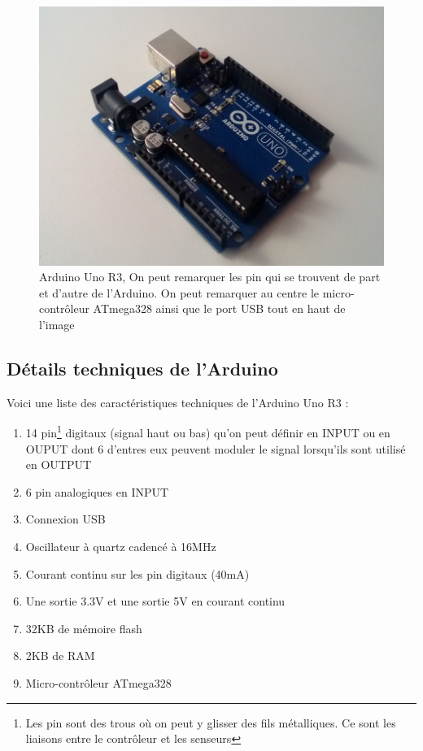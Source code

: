 \documentclass[a4paper,11pt]{report}
\begin{document}
{\begin{figure}[h]
\begin{center}
\includegraphics[scale=0.38]{arduino_uno.jpg}
\caption[Arduino Uno R3]{Arduino Uno R3\label{fig:ArduinoUnoR3}, On peut remarquer les pin  \label{pin} qui se trouvent de part et d'autre de l'Arduino. On peut remarquer au centre le micro-contrôleur ATmega328 ainsi que le port USB tout en haut de l'image}
\end{center}
\end{figure}


\subsection{Détails techniques de l'Arduino}

Voici une liste des caractéristiques techniques de l'Arduino Uno R3 \cite{Arduino}:
\begin{enumerate}
\item 14 pin\footnote{Les pin sont des trous où on peut y glisser des fils métalliques. Ce sont les liaisons entre le contrôleur et les senseurs} digitaux (signal haut ou bas) qu'on peut définir en INPUT ou en OUPUT dont 6 d'entres eux peuvent moduler le signal lorsqu'ils sont utilisé en OUTPUT
\item  6 pin analogiques en INPUT
\item Connexion USB
\item Oscillateur à quartz cadencé à 16MHz
\item Courant continu sur les pin digitaux (40mA)
\item Une sortie 3.3V et une sortie 5V en courant continu
\item 32KB de mémoire flash
\item 2KB de RAM
\item Micro-contrôleur ATmega328
\end{enumerate}
}
\end{document}
